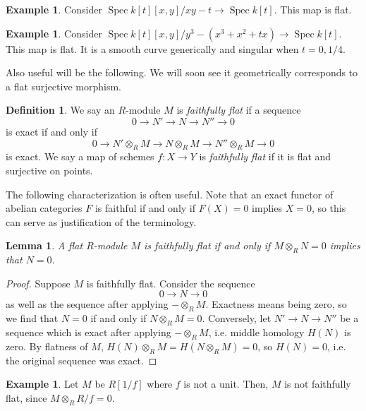 \documentclass[10pt]{article}
\newtheorem{lemma}[thm]{Lemma}
\theoremstyle{definition}
\newtheorem{exmp}[thm]{Example}
\newtheorem{defn}[thm]{Definition}
\DeclareMathOperator{\Spec}{Spec}
\begin{document}
\begin{exmp}
Consider $\Spec k[t][x,y]/xy-t \rightarrow \Spec k[t]$.  This map is flat.
\end{exmp}

\begin{exmp}
Consider $\Spec k[t][x,y]/y^3 - (x^3 + x^2 + tx) \rightarrow \Spec k[t]$.  This map is flat.  It is a smooth curve generically and singular when $t=0, 1/4$.
\end{exmp}



Also useful will be the following.  We will soon see it geometrically corresponds to a flat surjective morphism.
\begin{defn}
We say an $R$-module $M$ is \emph{faithfully flat} if a sequence 
$$0 \rightarrow N' \rightarrow N \rightarrow N'' \rightarrow 0$$
is exact if and only if
$$0 \rightarrow N' \otimes_R M \rightarrow N \otimes_R M \rightarrow N'' \otimes_R M \rightarrow 0$$
is exact.  We say a map of schemes $f: X \rightarrow Y$ is \emph{faithfully flat} if it is flat and surjective on points.
\end{defn}

The following characterization is often useful.  Note that an exact functor of abelian categories $F$ is faithful if and only if $F(X) = 0$ implies $X = 0$, so this can serve as justification of the terminology.
\begin{lemma}
A flat $R$-module $M$ is faithfully flat if and only if $M \otimes_R N = 0$ implies that $N = 0$. 
\end{lemma}
\begin{proof}
Suppose $M$ is faithfully flat.  Consider the sequence 
$$0 \rightarrow N \rightarrow 0$$
as well as the sequence after applying $- \otimes_R M$.  Exactness means being zero, so we find that $N = 0$ if and only if $N \otimes_R M = 0$.  Conversely, let $N' \rightarrow N \rightarrow N''$ be a sequence which is exact after applying $- \otimes_R M$, i.e. middle homology $H(N)$ is zero.  By flatness of $M$, $H(N) \otimes_R M = H(N \otimes_R M) = 0$, so $H(N) = 0$, i.e. the original sequence was exact.
\end{proof}

\begin{exmp}
Let $M$ be $R[1/f]$ where $f$ is not a unit.  Then, $M$ is not faithfully flat, since $M \otimes_R R/f = 0$.
\end{exmp}
\end{document}
